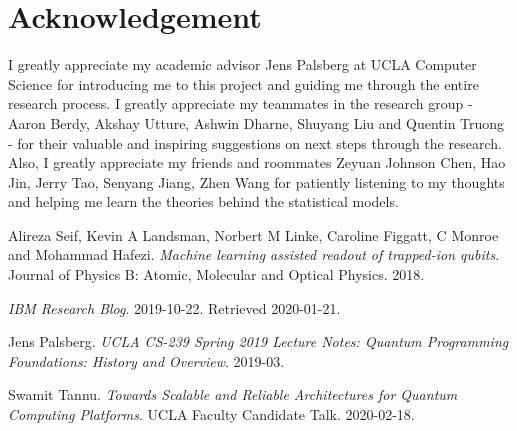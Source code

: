 \documentclass[letterpaper,twocolumn,10pt]{article}
\begin{document}
\section{Acknowledgement}

I greatly appreciate my academic advisor Jens Palsberg at UCLA Computer Science for introducing me to this project and guiding me through the entire research process. I greatly appreciate my teammates in the research group - Aaron Berdy, Akshay Utture, Ashwin Dharne, Shuyang Liu and Quentin Truong - for their valuable and inspiring suggestions on next steps through the research. Also, I greatly appreciate my friends and roommates Zeyuan Johnson Chen, Hao Jin, Jerry Tao, Senyang Jiang, Zhen Wang for patiently listening to my thoughts and helping me learn the theories behind the statistical models. 

\begin{thebibliography}{9}
    Alireza Seif, Kevin A Landsman, Norbert M Linke, Caroline Figgatt, C Monroe and Mohammad Hafezi.
    \textit{Machine learning assisted readout of trapped-ion qubits}. 
    Journal of Physics B: Atomic, Molecular and Optical Physics. 2018.

    \textit{IBM Research Blog}. 
    2019-10-22. Retrieved 2020-01-21.

    Jens Palsberg.
    \textit{UCLA CS-239 Spring 2019 Lecture Notes: Quantum Programming Foundations: History and Overview}.
    2019-03.

    Swamit Tannu.
    \textit{Towards Scalable and Reliable Architectures for Quantum Computing Platforms}.
    UCLA Faculty Candidate Talk. 2020-02-18.
\end{thebibliography}
\end{document}
